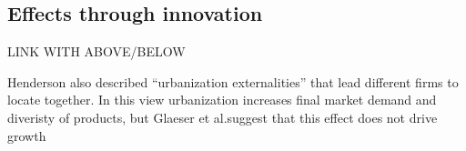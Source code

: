 

\subsection{Effects through innovation}

LINK WITH ABOVE/BELOW













Henderson also described ``urbanization externalities'' that lead different firms to locate together. In this view urbanization increases final market demand and diveristy of products, but Glaeser et al.suggest that this effect does not drive growth

